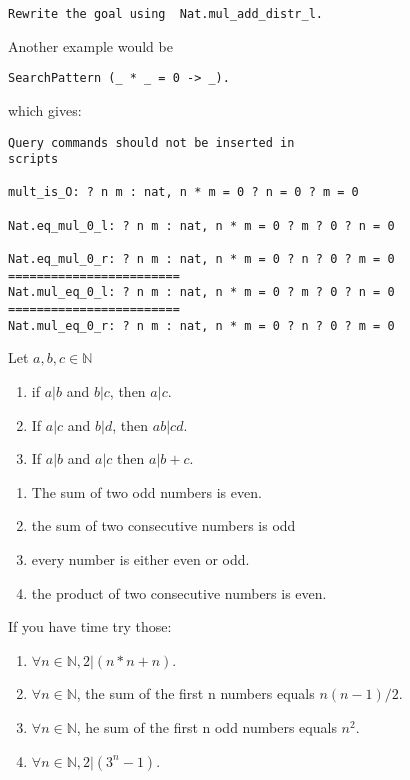 \documentclass{article}   	%
\begin{document}
  \begin{verbatim}
Rewrite the goal using  Nat.mul_add_distr_l.
 \end{verbatim}

Another example would be
\begin{verbatim}
SearchPattern (_ * _ = 0 -> _).
\end{verbatim}
which gives:

\begin{verbatim}
Query commands should not be inserted in
scripts

mult_is_O: ? n m : nat, n * m = 0 ? n = 0 ? m = 0

Nat.eq_mul_0_l: ? n m : nat, n * m = 0 ? m ? 0 ? n = 0

Nat.eq_mul_0_r: ? n m : nat, n * m = 0 ? n ? 0 ? m = 0
========================
Nat.mul_eq_0_l: ? n m : nat, n * m = 0 ? m ? 0 ? n = 0
========================
Nat.mul_eq_0_r: ? n m : nat, n * m = 0 ? n ? 0 ? m = 0
\end{verbatim}


\begin{lemma} Let $a,b,c \in \mathbb{N}$
\begin{enumerate}

\item  if $a | b$ and $b | c$, then $a | c$.
\item If $a | c$ and $b | d$, then $ab | cd$.
\item If   $a | b $ and $a | c$  then $a | b+c$.

\end{enumerate}

\end{lemma}


\begin{lemma}
\begin{enumerate}

\item The sum of two odd numbers is even.
\item the sum of two consecutive numbers is odd
\item every number is either even or odd.
\item the product of two consecutive numbers is even.


\end{enumerate}

\end{lemma}

If you have time try those:

\begin{lemma}

\begin{enumerate} 
\item $\forall n \in \mathbb{N},  2 | (n * n + n)$.
\item $\forall n \in \mathbb{N}$, the sum of the first n numbers equals $n(n-1)/2$.
\item $\forall n \in \mathbb{N}$, he sum of the first n odd numbers equals $n^2$.
\item $\forall n \in \mathbb{N}, 2 | (3^n - 1)$.



\end{enumerate}

\end{lemma}
\end{document}
